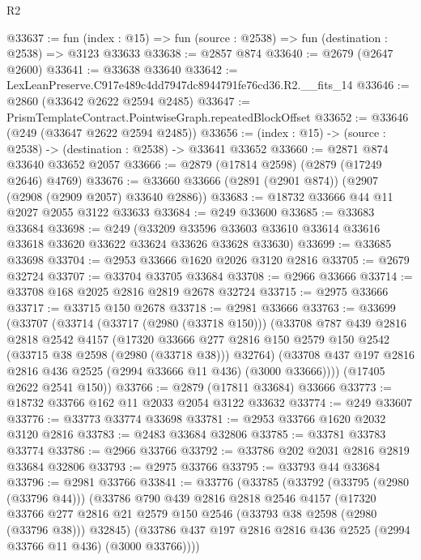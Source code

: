 \begin{lexlean}{R2}
\begin{coremodule}
@33637 := fun (index : @15) => fun (source : @2538) => fun (destination : @2538) => @3123 @33633
@33638 := @2857 @874
@33640 := @2679 (@2647 @2600)
@33641 := @33638 @33640
@33642 := LexLeanPreserve.C917e489c4dd7947dc8944791fe76cd36.R2.__fits_14
@33646 := @2860 (@33642 @2622 @2594 @2485)
@33647 := PrismTemplateContract.PointwiseGraph.repeatedBlockOffset
@33652 := @33646 (@249 (@33647 @2622 @2594 @2485))
@33656 := (index : @15) -> (source : @2538) -> (destination : @2538) -> @33641 @33652
@33660 := @2871 @874 @33640 @33652 @2057
@33666 := @2879 (@17814 @2598) (@2879 (@17249 @2646) @4769)
@33676 := @33660 @33666 (@2891 (@2901 @874)) (@2907 (@2908 (@2909 @2057) @33640 @2886))
@33683 := @18732 @33666 @44 @11 @2027 @2055 @3122 @33633
@33684 := @249 @33600
@33685 := @33683 @33684
@33698 := @249
    (@33209 @33596 @33603 @33610 @33614 @33616 @33618 @33620 @33622 @33624 @33626 @33628 @33630)
@33699 := @33685 @33698
@33704 := @2953 @33666 @1620 @2026 @3120 @2816
@33705 := @2679 @32724
@33707 := @33704 @33705 @33684
@33708 := @2966 @33666
@33714 := @33708 @168 @2025 @2816 @2819 @2678 @32724
@33715 := @2975 @33666
@33717 := @33715 @150 @2678
@33718 := @2981 @33666
@33763 := @33699
    (@33707
      (@33714
        (@33717 (@2980 (@33718 @150)))
        (@33708
          @787
          @439
          @2816
          @2818
          @2542
          @4157
          (@17320
            @33666
            @277
            @2816
            @150
            @2579
            @150
            @2542
            (@33715 @38 @2598 (@2980 (@33718 @38)))
            @32764)
          (@33708 @437 @197 @2816 @2816 @436 @2525 (@2994 @33666 @11 @436) (@3000 @33666))))
      (@17405 @2622 @2541 @150))
@33766 := @2879 (@17811 @33684) @33666
@33773 := @18732 @33766 @162 @11 @2033 @2054 @3122 @33632
@33774 := @249 @33607
@33776 := @33773 @33774 @33698
@33781 := @2953 @33766 @1620 @2032 @3120 @2816
@33783 := @2483 @33684 @32806
@33785 := @33781 @33783 @33774
@33786 := @2966 @33766
@33792 := @33786 @202 @2031 @2816 @2819 @33684 @32806
@33793 := @2975 @33766
@33795 := @33793 @44 @33684
@33796 := @2981 @33766
@33841 := @33776
    (@33785
      (@33792
        (@33795 (@2980 (@33796 @44)))
        (@33786
          @790
          @439
          @2816
          @2818
          @2546
          @4157
          (@17320
            @33766
            @277
            @2816
            @21
            @2579
            @150
            @2546
            (@33793 @38 @2598 (@2980 (@33796 @38)))
            @32845)
          (@33786 @437 @197 @2816 @2816 @436 @2525 (@2994 @33766 @11 @436) (@3000 @33766))))

\end{coremodule}
\end{lexlean}
